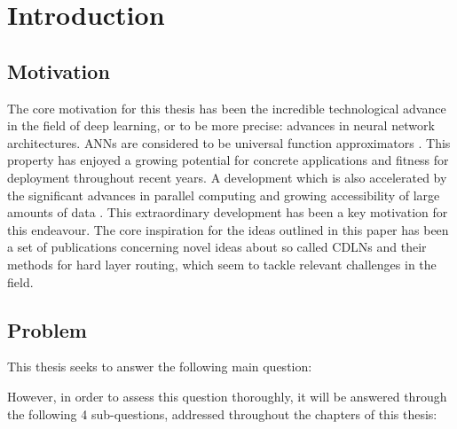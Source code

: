 


\chapter{Introduction}

\section{Motivation} 

The core motivation for this thesis has been the incredible technological advance in the field of deep learning, or to be more precise: advances in neural network architectures.
\acp{ANN} are considered to be universal function
approximators \cite[chapter 4]{nielsenneural} \cite[subsection 6.4.1]{Goodfellow-et-al-2016}.
This property has enjoyed a growing potential for concrete applications and fitness for deployment throughout recent years.
A development which is also accelerated by the significant advances in parallel computing and growing accessibility of large amounts of data \cite[section 1.2]{Goodfellow-et-al-2016}.
This extraordinary development has been a key motivation for this endeavour.
The core inspiration for the ideas outlined in this paper has been a set of publications concerning novel ideas about so called \acp{CDLN} \cite{14_sparsely-gated-experts_2017}\cite{27_path-net-evolution}\cite{24_MoE-eigen2014} and their methods for hard layer routing, which seem to tackle relevant challenges in the field. 

\section{Problem}
 
This thesis seeks to answer the following main question:

\begin{center}
    \setlength{\fboxsep}{1em}
\end{center}


However, in order to assess this question thoroughly, it will be answered through the following 4 sub-questions, addressed throughout the chapters of this thesis:

